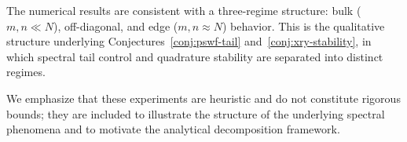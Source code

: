 The numerical results are consistent with a
three-regime structure:
bulk ($m, n \ll N$),
off-diagonal, and edge ($m, n \approx N$) behavior.
This is the qualitative structure
underlying Conjectures~\ref{conj:pswf-tail}
and~\ref{conj:xry-stability},
in which spectral tail control
and quadrature stability are separated into distinct regimes.

We emphasize that these experiments are heuristic
and do not constitute rigorous bounds;
they are included to illustrate
the structure of the underlying spectral phenomena
and to motivate the analytical decomposition framework.




